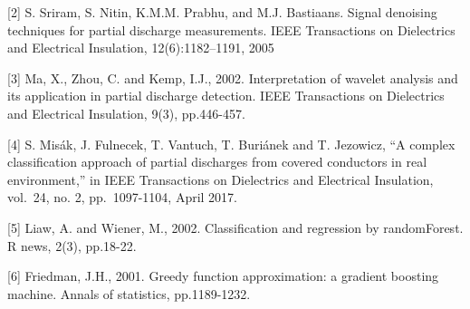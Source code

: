 \documentclass[11pt]{article}
\begin{document}
{[}2{]} S. Sriram, S. Nitin, K.M.M. Prabhu, and M.J. Bastiaans. Signal
denoising techniques for partial discharge measurements. IEEE
Transactions on Dielectrics and Electrical Insulation, 12(6):1182--1191,
2005

{[}3{]} Ma, X., Zhou, C. and Kemp, I.J., 2002. Interpretation of wavelet
analysis and its application in partial discharge detection. IEEE
Transactions on Dielectrics and Electrical Insulation, 9(3), pp.446-457.

{[}4{]} S. Misák, J. Fulnecek, T. Vantuch, T. Buriánek and T. Jezowicz,
``A complex classification approach of partial discharges from covered
conductors in real environment,'' in IEEE Transactions on Dielectrics
and Electrical Insulation, vol.~24, no. 2, pp.~1097-1104, April 2017.

{[}5{]} Liaw, A. and Wiener, M., 2002. Classification and regression by
randomForest. R news, 2(3), pp.18-22.

{[}6{]} Friedman, J.H., 2001. Greedy function approximation: a gradient boosting machine. Annals of statistics, pp.1189-1232.


    
    
    
    
\end{document}
